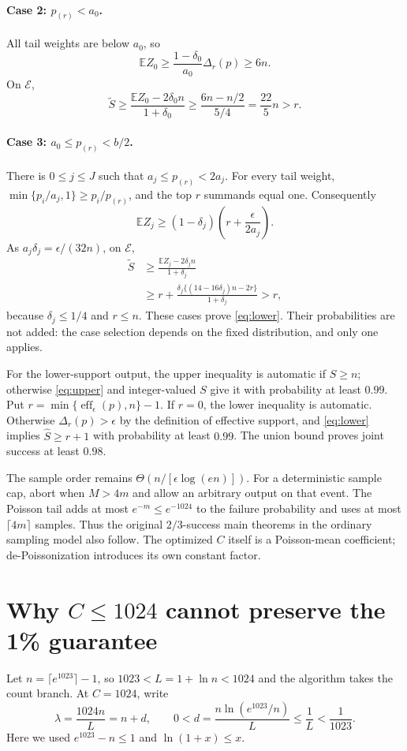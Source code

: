 \documentclass[11pt]{article}
\newcommand{\E}{\mathbb E}
\begin{document}
\paragraph{Case 2: $p_{(r)}<a_0$.}
All tail weights are below $a_0$, so
\[
 \E Z_0\ge\frac{1-\delta_0}{a_0}\Delta_r(p)\ge6n.
\]
On $\mathcal E$,
\[
 \widetilde S\ge\frac{\E Z_0-2\delta_0 n}{1+\delta_0}
 \ge\frac{6n-n/2}{5/4}=\frac{22}{5}n>r.
\]

\paragraph{Case 3: $a_0\le p_{(r)}<b/2$.}
There is $0\le j\le J$ such that $a_j\le p_{(r)}<2a_j$.
For every tail weight, $\min\{p_i/a_j,1\}\ge p_i/p_{(r)}$, and the top
$r$ summands equal one. Consequently
\[
 \E Z_j\ge(1-\delta_j)\left(r+\frac{\epsilon}{2a_j}\right).
\]
As $a_j\delta_j=\epsilon/(32n)$, on $\mathcal E$,
\begin{align*}
 \widetilde S
 &\ge\frac{\E Z_j-2\delta_jn}{1+\delta_j}\\
 &\ge r+\frac{\delta_j\{(14-16\delta_j)n-2r\}}{1+\delta_j}>r,
\end{align*}
because $\delta_j\le1/4$ and $r\le n$.
These cases prove \eqref{eq:lower}. Their probabilities are not added:
the case selection depends on the fixed distribution, and only one applies.

For the lower-support output, the upper inequality is automatic if $S\ge n$;
otherwise \eqref{eq:upper} and integer-valued $S$ give it with probability
at least $0.99$. Put $r=\min\{\operatorname{eff}_\epsilon(p),n\}-1$.
If $r=0$, the lower inequality is automatic. Otherwise
$\Delta_r(p)>\epsilon$ by the definition of effective support, and
\eqref{eq:lower} implies $\widehat S\ge r+1$ with probability at least $0.99$.
The union bound proves joint success at least $0.98$.

The sample order remains $\Theta(n/[\epsilon\log(en)])$.
For a deterministic sample cap, abort when $M>4m$ and allow an arbitrary
output on that event. The Poisson tail adds at most $e^{-m}\le e^{-1024}$
to the failure probability and uses at most $\lceil4m\rceil$ samples.
Thus the original $2/3$-success main theorems in the ordinary sampling model
also follow. The optimized $C$ itself is a Poisson-mean coefficient;
de-Poissonization introduces its own constant factor.

\section{Why $C\le1024$ cannot preserve the 1\% guarantee}
Let $n=\lceil e^{1023}\rceil-1$, so $1023<L=1+\ln n<1024$ and the
algorithm takes the count branch. At $C=1024$, write
\[
 \lambda=\frac{1024n}{L}=n+d,\qquad
 0<d=\frac{n\ln(e^{1023}/n)}L\le\frac1L<\frac1{1023}.
\]
Here we used $e^{1023}-n\le1$ and $\ln(1+x)\le x$.
\end{document}
